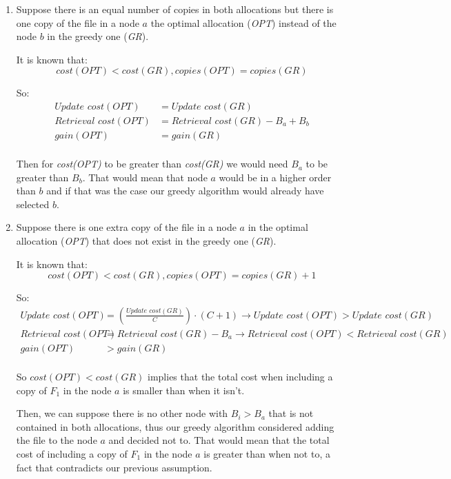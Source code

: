 \begin{enumerate}
  \item Suppose there is an equal number of copies in both allocations but there is one copy of the file in a node $a$ the optimal allocation (\textit{OPT}) instead of the node $b$ in the greedy one (\textit{GR}).

It is known that: 
$$ cost(OPT) < cost(GR), copies(OPT) = copies(GR) $$

So:
\hspace{-0.5cm}  
\begin{align*}
  \textit{Update cost}(OPT) &= \textit{Update cost}(GR) \\
  \textit{Retrieval cost}(OPT) &= \textit{Retrieval cost}(GR) - B_a + B_b \\ 
  gain(OPT) &= gain(GR) \\
\end{align*}

Then for \textit{cost(OPT)} to be greater than \textit{cost(GR)} we would need $B_a$ to be greater than $B_b$. That would mean that node $a$ would be in a higher order than $b$ and if that was the case our greedy algorithm would already have selected $b$.

  \item Suppose there is one extra copy of the file in a node $a$ in the optimal allocation (\textit{OPT}) that does not exist in the greedy one (\textit{GR}).

It is known that: 
$$ cost(OPT) < cost(GR), copies(OPT) = copies(GR) + 1 $$

So: 
\begin{align*}
  \textit{Update cost}(OPT) &= (\frac{\textit{Update cost}(GR)}{C}) \cdot (C+1) \rightarrow \textit{Update cost}(OPT) > \textit{Update cost}(GR) \\
  \textit{Retrieval cost}(OPT) &= \textit{Retrieval cost}(GR) - B_a \rightarrow \textit{Retrieval cost}(OPT) < \textit{Retrieval cost}(GR) \\
  gain(OPT) &> gain(GR) \\
\end{align*}
  
So $cost(OPT) < cost(GR)$ implies that the total cost when including a copy of $F_1$ in the node $a$ is smaller than when it isn't.

Then, we can suppose there is no other node with $B_i > B_a$ that is not contained in both allocations, thus our greedy algorithm considered adding the file to the node $a$ and decided not to. That would mean that the total cost of including a  copy of $F_1$ in the node $a$ is greater than when not to, a fact that contradicts our previous assumption.


\end{enumerate}
